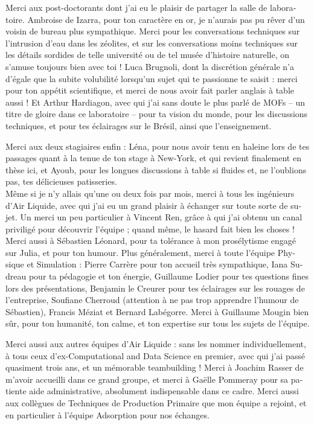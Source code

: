\begin{otherlanguage}{french}
Merci aux post-doctorants dont j'ai eu le plaisir de partager la salle de laboratoire. Ambroise de Izarra, pour ton caractère en or, je n'aurais pas pu rêver d'un voisin de bureau plus sympathique. Merci pour les conversations techniques sur l'intrusion d'eau dans les zéolites, et sur les conversations moins techniques sur les détails sordides de telle université ou de tel musée d'histoire naturelle, on s'amuse toujours bien avec toi ! Luca Brugnoli, dont la discrétion générale n'a d'égale que la subite volubilité lorsqu'un sujet qui te passionne te saisit : merci pour ton appétit scientifique, et merci de nous avoir fait parler anglais à table aussi ! Et Arthur Hardiagon, avec qui j'ai sans doute le plus parlé de MOFs -- un titre de gloire dans ce laboratoire -- pour ta vision du monde, pour les discussions techniques, et pour tes éclairages sur le Brésil, ainsi que l'enseignement.

Merci aux deux stagiaires enfin : Léna, pour nous avoir tenu en haleine lors de tes passages quant à la tenue de ton stage à New-York, et qui revient finalement en thèse ici, et Ayoub, pour les longues discussions à table si fluides et, ne l'oublions pas, tes délicieuses patisseries.\\

Même si je n'y allais qu'une ou deux fois par mois, merci à tous les ingénieurs d'Air Liquide, avec qui j'ai eu un grand plaisir à échanger sur toute sorte de sujet. Un merci un peu particulier à Vincent Ren, grâce à qui j'ai obtenu un canal priviligé pour découvrir l'équipe ; quand même, le hasard fait bien les choses ! Merci aussi à Sébastien Léonard, pour ta tolérance à mon prosélytisme engagé sur Julia, et pour ton humour. Plus généralement, merci à toute l'équipe Physique et Simulation : Pierre Carrère pour ton accueil très sympathique, Iana Sudreau pour ta pédagogie et ton énergie, Guillaume Lodier pour tes questions fines lors des présentations, Benjamin le Creurer pour tes éclairages sur les rouages de l'entreprise, Soufiane Cherroud (attention à ne pas trop apprendre l'humour de Sébastien), Francis Méziat et Bernard Labégorre. Merci à Guillaume Mougin bien sûr, pour ton humanité, ton calme, et ton expertise sur tous les sujets de l'équipe.

Merci aussi aux autres équipes d'Air Liquide : sans les nommer individuellement, à tous ceux d'ex-Computational and Data Science en premier, avec qui j'ai passé quasiment trois ans, et un mémorable teambuilding ! Merci à Joachim Rasser de m'avoir accueilli dans ce grand groupe, et merci à Gaëlle Pommeray pour sa patiente aide administrative, absolument indispensable dans ce cadre. Merci aussi aux collègues de Techniques de Production Primaire que mon équipe a rejoint, et en particulier à l'équipe Adsorption pour nos échanges.\\


\end{otherlanguage}
